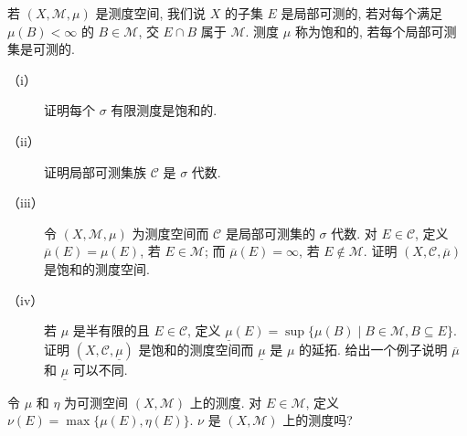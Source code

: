 \documentclass[../../main.tex]{subfiles}
\begin{document}
\begin{exercise}\label{exercise:ch17-10}
若 $(X,\mathcal{M},\mu)$ 是测度空间, 我们说 $X$ 的子集 $E$ 是局部可测的, 若对每个满足 $\mu(B)<\infty$ 的 $B\in\mathcal{M}$, 交 $E\cap B$ 属于 $\mathcal{M}$. 测度 $\mu$ 称为饱和的, 若每个局部可测集是可测的.
\begin{description}
\item[（i）] 证明每个 $\sigma$ 有限测度是饱和的.
\item[（ii）] 证明局部可测集族 $\mathcal{C}$ 是 $\sigma$ 代数.
\item[（iii）] 令 $(X,\mathcal{M},\mu)$ 为测度空间而 $\mathcal{C}$ 是局部可测集的 $\sigma$ 代数. 对 $E\in\mathcal{C}$, 定义 $\overline{\mu}(E)=\mu(E)$, 若 $E\in\mathcal{M}$; 而 $\overline{\mu}(E)=\infty$, 若 $E\notin\mathcal{M}$. 证明 $(X,\mathcal{C},\overline{\mu})$ 是饱和的测度空间.
\item[（iv）] 若 $\mu$ 是半有限的且 $E\in\mathcal{C}$, 定义 $\underline{\mu}(E)=\sup\{\mu(B)\mid B\in\mathcal{M},B\subseteq E\}$. 证明 $(X,\mathcal{C},\underline{\mu})$ 是饱和的测度空间而 $\underline{\mu}$ 是 $\mu$ 的延拓. 给出一个例子说明 $\overline{\mu}$ 和 $\underline{\mu}$ 可以不同.
\end{description}
\end{exercise}

\begin{exercise}\label{exercise:ch17-11}
令 $\mu$ 和 $\eta$ 为可测空间 $(X,\mathcal{M})$ 上的测度. 对 $E\in\mathcal{M}$, 定义 $\nu(E)=\max\{\mu(E),\eta(E)\}$. $\nu$ 是 $(X,\mathcal{M})$ 上的测度吗?
\end{exercise}
\end{document}
